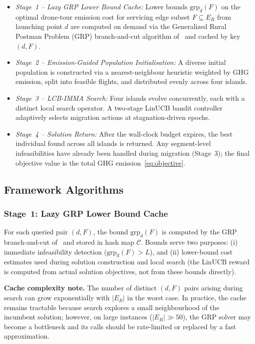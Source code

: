 \documentclass[a4paper,fleqn]{cas-dc}
\begin{document}
\begin{itemize}
\item \textit{Stage~1 – Lazy GRP Lower Bound Cache:} Lower bounds $\mathrm{grp}_d(F)$ on the optimal drone-tour emission cost for servicing edge subset $F \subseteq E_R$ from launching point $d$ are computed on demand via the Generalized Rural Postman Problem (GRP) branch-and-cut algorithm of~\cite{corbera2007} and cached by key $(d, F)$. 
\item \textit{Stage~2 – Emission-Guided Population Initialisation:} A diverse initial population is constructed via a nearest-neighbour heuristic weighted by GHG emission, split into feasible flights, and distributed evenly across four islands. 
\item \textit{Stage~3 – LCB-IMMA Search:} Four islands evolve concurrently, each with a distinct local search operator. A two-stage LinUCB bandit controller adaptively selects migration actions at stagnation-driven epochs.
 \item \textit{Stage~4 – Solution Return:} After the wall-clock budget expires, the best individual found across all islands is returned. Any segment-level infeasibilities have already been handled during migration (Stage~3); the final objective value is the total GHG emission~\eqref{eq:objective}.
\end{itemize}

\subsection{Framework Algorithms}\label{sec:algorithms}

\subsubsection{Stage~1: Lazy GRP Lower Bound Cache}\label{sec:alg1}

For each queried pair $(d, F)$, the bound $\mathrm{grp}_d(F)$ is computed by the GRP branch-and-cut of~\cite{corbera2007} and stored in hash map $\mathcal{C}$. Bounds serve two purposes: (i) immediate infeasibility detection ($\mathrm{grp}_d(F) > L$), and (ii) lower-bound cost estimates used during solution construction and local search (the LinUCB reward is computed from actual solution objectives, not from these bounds directly).

\textbf{Cache complexity note.} The number of distinct $(d, F)$ pairs arising during search can grow exponentially with $|E_R|$ in the worst case. In practice, the cache remains tractable because search explores a small neighbourhood of the incumbent solution; however, on large instances ($|E_R| \gg 50$), the GRP solver may become a bottleneck and its calls should be rate-limited or replaced by a fast approximation.
\end{document}
